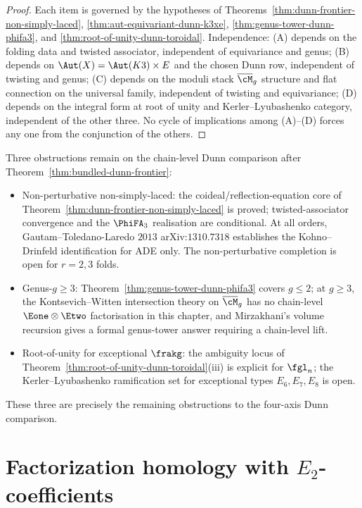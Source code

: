 \begin{proof}
Each item is governed by the hypotheses of Theorems~\ref{thm:dunn-frontier-non-simply-laced}, \ref{thm:aut-equivariant-dunn-k3xe}, \ref{thm:genus-tower-dunn-phifa3}, and \ref{thm:root-of-unity-dunn-toroidal}. Independence: (A) depends on the folding data and twisted associator, independent of equivariance and genus; (B) depends on $\Aut(X) = \Aut(K3) \times E$ and the chosen Dunn row, independent of twisting and genus; (C) depends on the moduli stack $\overline{\cM}_g$ structure and flat connection on the universal family, independent of twisting and equivariance; (D) depends on the integral form at root of unity and Kerler--Lyubashenko category, independent of the other three. No cycle of implications among (A)--(D) forces any one from the conjunction of the others.
\end{proof}

\begin{remark}
\label{rem:remaining-obstructions-dunn-frontier}
Three obstructions remain on the chain-level Dunn comparison after Theorem~\ref{thm:bundled-dunn-frontier}:
\begin{itemize}
\item Non-perturbative non-simply-laced: the coideal/reflection-equation core of Theorem~\ref{thm:dunn-frontier-non-simply-laced} is proved; twisted-associator convergence and the $\PhiFA_3$ realisation are conditional. At all orders, Gautam--Toledano-Laredo $2013$ arXiv:$1310.7318$ establishes the Kohno--Drinfeld identification for ADE only. The non-perturbative completion is open for $r = 2, 3$ folds.
\item Genus-$g \geq 3$: Theorem~\ref{thm:genus-tower-dunn-phifa3} covers $g \leq 2$; at $g \geq 3$, the Kontsevich--Witten intersection theory on $\overline{\cM}_g$ has no chain-level $\Eone \otimes \Etwo$ factorisation in this chapter, and Mirzakhani's volume recursion gives a formal genus-tower answer requiring a chain-level lift.
\item Root-of-unity for exceptional $\frakg$: the ambiguity locus of Theorem~\ref{thm:root-of-unity-dunn-toroidal}(iii) is explicit for $\fgl_n$; the Kerler--Lyubashenko ramification set for exceptional types $E_6, E_7, E_8$ is open.
\end{itemize}
These three are precisely the remaining obstructions to the four-axis Dunn comparison.
\end{remark}


\section{Factorization homology with \texorpdfstring{$E_2$}{E-2}-coefficients}
\label{sec:fh-e2}

